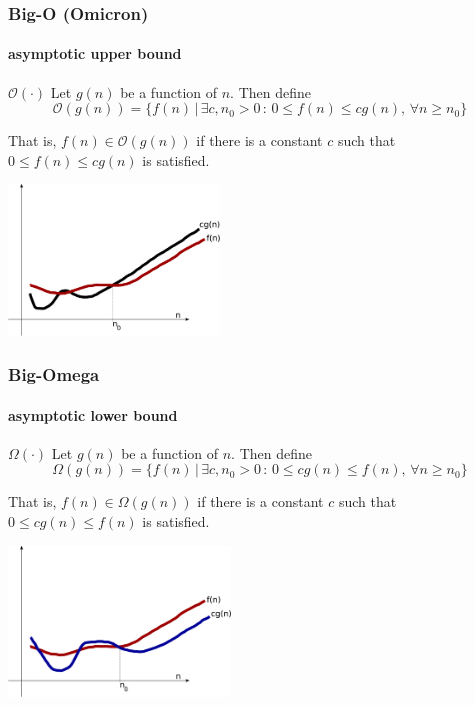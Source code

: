 \documentclass[10pt]{beamer}
\newcommand{\mO}{{\mathcal{O}}}
\begin{document}
\begin{frame}
\frametitle{Big-O (Omicron)}
\framesubtitle{asymptotic upper bound}
\begin{block}{$\mO(\cdot)$}
Let $g(n)$ be a function of $n$.  Then define
\begin{equation*}
  \mO(g(n)) = \{f(n)\,|\, \exists c,n_0>0 \,:\, 0\leq f(n)\leq cg(n),\, \forall
n\geq n_0\}
\end{equation*}

That is, $f(n)\in \mO(g(n))$ if there is a constant $c$ such that $0\leq f(n)
\leq cg(n)$ is satisfied.
\end{block}
\begin{center} 
  \includegraphics[height=4cm]{./figs/bigo_1}
\end{center}
\end{frame}
\begin{frame}
\frametitle{Big-Omega}
\framesubtitle{asymptotic lower bound}
\begin{block}{$\Omega(\cdot)$}
Let $g(n)$ be a function of $n$.  Then define
\begin{equation*}
  \Omega(g(n)) = \{f(n)\,|\, \exists c,n_0>0 \,:\, 0\leq cg(n) \leq f(n),\, \forall n\geq n_0\}
\end{equation*}

That is, $f(n)\in \Omega(g(n))$ if there is a constant $c$ such that $0\leq cg(n) \leq f(n)$ is satisfied.
\end{block}
\begin{center}
  \includegraphics[height=4cm]{./figs/bigo_2}
\end{center}
\end{frame}
\end{document}
